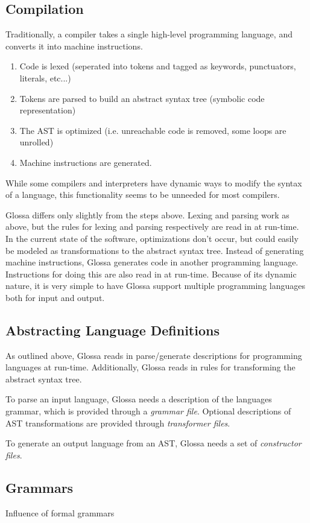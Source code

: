 \documentclass{article}
\begin{document}
\subsection{Compilation}
Traditionally, a compiler takes a single high-level programming language, and converts it into machine instructions.
\begin{enumerate}
\item Code is lexed (seperated into tokens and tagged as keywords, punctuators, literals, etc...)
\item Tokens are parsed to build an abstract syntax tree (symbolic code representation)
\item The AST is optimized (i.e. unreachable code is removed, some loops are unrolled)
\item Machine instructions are generated.
\end{enumerate}
While some compilers and interpreters have dynamic ways to modify the syntax of a language, this functionality seems to be unneeded for most compilers.

Glossa differs only slightly from the steps above. Lexing and parsing work as above, but the rules for lexing and parsing respectively are read in at run-time. 
In the current state of the software, optimizations don't occur, but could easily be modeled as transformations to the abstract syntax tree.
Instead of generating machine instructions, Glossa generates code in another programming language. 
Instructions for doing this are also read in at run-time.
Because of its dynamic nature, it is very simple to have Glossa support multiple programming languages both for input and output.

\subsection{Abstracting Language Definitions}

As outlined above, Glossa reads in parse/generate descriptions for programming languages at run-time.
Additionally, Glossa reads in rules for transforming the abstract syntax tree.

To parse an input language, Glossa needs a description of the languages grammar, which is provided through a \textit{grammar file}.
Optional descriptions of AST transformations are provided through \textit{transformer files}.

To generate an output language from an AST, Glossa needs a set of \textit{constructor files}.

\subsection{Grammars}
Influence of formal grammars
\end{document}

